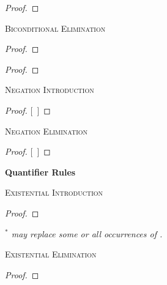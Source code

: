 \begin{proof}
	 
\end{proof}

\textsc{Biconditional Elimination}

\begin{proof}
	 
\end{proof}

\begin{proof}
	 
\end{proof}



\textsc{Negation Introduction}

\begin{proof}
\open
	\metaA{}
	\metaB{}
\close
{}[\ ]{\enot\metaA{}}
\end{proof}

\textsc{Negation Elimination}

\begin{proof}
\open
	\metaB{}
\close
{}[\ ]\metaA{}
\end{proof}






\newpage

{\large \bf Quantifier Rules}

\textsc{Existential Introduction}

\begin{proof}
	 
\end{proof}

\begin{footnotesize}\emph{
$^\ast$  may replace some or all occurrences of .}
\end{footnotesize}


\textsc{Existential Elimination}

\begin{proof}
	\open	
	\close
	 
\end{proof}

